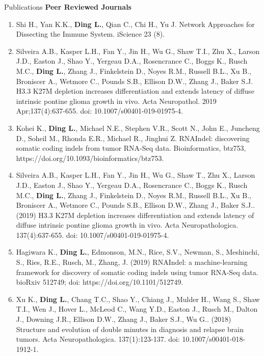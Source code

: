 \documentclass{resume} %
\begin{document}

\begin{rSection}{Publications}
\textbf{Peer Reviewed Journals}
\begin{enumerate}
\item Shi H., Yan K.K., \textbf{Ding L.}, Qian C., Chi H., Yu J. Network Approaches for Dissecting the Immune System. iScience 23 (8).

\item Silveira A.B., Kasper L.H., Fan Y., Jin H., Wu G., Shaw T.I., Zhu X., Larson J.D., Easton J., Shao Y., Yergeau D.A., Rosencrance C., Boggs K., Rusch M.C., \textbf{Ding L.}, Zhang J., Finkelstein D., Noyes R.M., Russell B.L., Xu B., Broniscer A., Wetmore C., Pounds S.B., Ellison D.W., Zhang J., Baker S.J. H3.3 K27M depletion increases differentiation and extends latency of diffuse intrinsic pontine glioma growth in vivo. Acta Neuropathol. 2019 Apr;137(4):637-655. doi: 10.1007/s00401-019-01975-4.

\item Kohei K., \textbf{Ding L.}, Michael N.E., Stephen V.R., Scott N., John E., Juncheng D., Soheil M., Rhonda E.R., Michael R., Jinghui Z. RNAIndel: discovering somatic coding indels from tumor RNA-Seq data. Bioinformatics, btz753, https://doi.org/10.1093/bioinformatics/btz753.

\item Silveira A.B., Kasper L.H., Fan Y., Jin H., Wu G., Shaw T., Zhu X., Larson J.D., Easton J., Shao Y., Yergeau D.A., Rosencrance C., Boggs K., Rusch M.C., \textbf{Ding L.}, Zhang J., Finkelstein D., Noyes R.M., Russell B.L., Xu B., Broniscer A., Wetmore C., Pounds S.B., Ellison D.W., Zhang J., Baker S.J.. (2019) H3.3 K27M depletion increases differentiation and extends latency of diffuse intrinsic pontine glioma growth in vivo. Acta Neuropathologica. 137(4):637-655. doi: 10.1007/s00401-019-01975-4.

\item Hagiwara K., \textbf{Ding L.}, Edmonson, M.N., Rice, S.V., Newman, S., Meshinchi, S., Ries, R.E., Rusch, M., Zhang, J. (2019) RNAIndel: a machine-learning framework for discovery of somatic coding indels using tumor RNA-Seq data. bioRxiv 512749; doi: https://doi.org/10.1101/512749.

\item Xu K., \textbf{Ding L.}, Chang T.C., Shao Y., Chiang J., Mulder H., Wang S., Shaw T.I., Wen J., Hover L., McLeod C., Wang Y.D., Easton J., Rusch M., Dalton J., Downing J.R., Ellison D.W., Zhang J., Baker S.J., Wu G.. (2018) Structure and evolution of double minutes in diagnosis and relapse brain tumors. Acta Neuropathologica. 137(1):123-137. doi: 10.1007/s00401-018-1912-1.


\end{enumerate}
\end{rSection}
\end{document}
